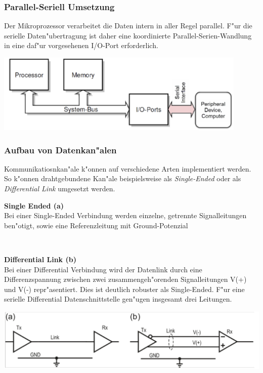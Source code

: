 \subsubsection{Parallel-Seriell Umsetzung}
Der Mikroprozessor verarbeitet die Daten intern in aller Regel parallel. F"ur die serielle Daten"ubertragung ist daher eine koordinierte Parallel-Serien-Wandlung in eine daf"ur vorgesehenen I/O-Port erforderlich.
	\begin{center}
		\includegraphics[width=12cm]{images/seriell_parallel}
	\end{center}
	
\subsubsection{Aufbau von Datenkan"alen}Kommunikatiosnkan"ale k"onnen auf verschiedene Arten implementiert werden. So k"onnen drahtgebundene Kan"ale beispielsweise als \textit{Single-Ended} oder als \textit{Differential Link} umgesetzt werden.\\
	
	\begin{minipage}[t]{9cm}
		\textbf{Single Ended (a)}\\
		Bei einer Single-Ended Verbindung werden einzelne, getrennte Signalleitungen ben"otigt, sowie eine Referenzleitung mit Ground-Potenzial
	\end{minipage}
	\begin{minipage}[t]{0.5cm}
		\-\
	\end{minipage}
	\begin{minipage}[t]{9cm}
		\textbf{Differential Link (b)}\\
		Bei einer Differential Verbindung wird der Datenlink durch eine Differenzspannung zwischen zwei zusammengeh"orenden Signalleitungen V(+) und V(-) repr"asentiert. Dies ist deutlich robuster als Single-Ended. F"ur eine serielle Differential Datenschnittstelle gen"ugen insgesamt drei Leitungen.
	\end{minipage}
	
	\begin{center}
		\includegraphics[width = 16cm]{images/diff_link}
	\end{center}

